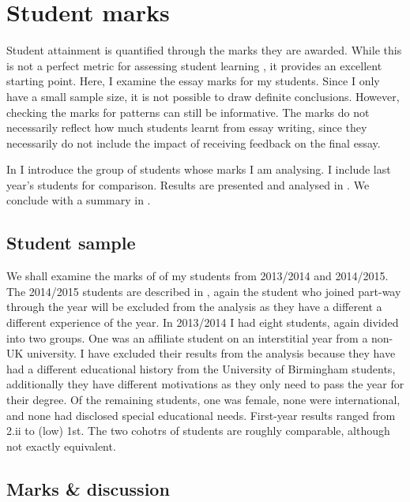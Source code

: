 \chapter{Student marks}\label{ap:marks}

Student attainment is quantified through the marks they are awarded. While this is not a perfect metric for assessing student learning \citep[cf.][chapter 11]{Ramsden1992}, it provides an excellent starting point. Here, I examine the essay marks for my students. Since I only have a small sample size, it is not possible to draw definite conclusions. However, checking the marks for patterns can still be informative. The marks do not necessarily reflect how much students learnt from essay writing, since they necessarily do not include the impact of receiving feedback on the final essay.

In  I introduce the group of students whose marks I am analysing. I include last year's students for comparison. Results are presented and analysed in . We conclude with a summary in .

\section{Student sample}\label{sec:marks-students}

We shall examine the marks of of my students from 2013/2014 and 2014/2015. The 2014/2015 students are described in , again the student who joined part-way through the year will be excluded from the analysis as they have a different a different experience of the year. In 2013/2014 I had eight students, again divided into two groups. One was an affiliate student on an interstitial year from a non-UK university. I have excluded their results from the analysis because they have had a different educational history from the University of Birmingham students, additionally they have different motivations as they only need to pass the year for their degree. Of the remaining students, one was female, none were international, and none had disclosed special educational needs. First-year results ranged from 2.ii to (low) 1st. The two cohotrs of students are roughly comparable, although not exactly equivalent.

\section{Marks \& discussion}\label{sec:plots}

